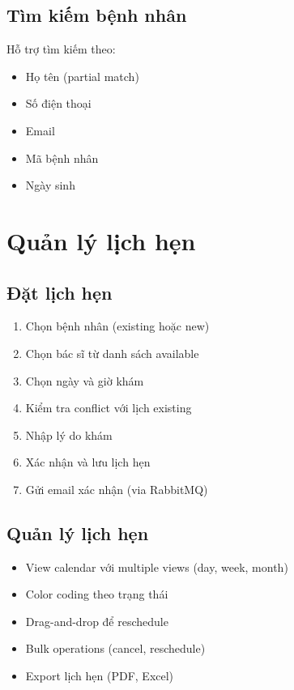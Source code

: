 \documentclass[12pt,a4paper]{report}
\begin{document}
    \subsection{Tìm kiếm bệnh nhân}
    Hỗ trợ tìm kiếm theo:
    \begin{itemize}
        \item Họ tên (partial match)
        \item Số điện thoại
        \item Email
        \item Mã bệnh nhân
        \item Ngày sinh
    \end{itemize}

    \section{Quản lý lịch hẹn}

    \subsection{Đặt lịch hẹn}
    \begin{enumerate}
        \item Chọn bệnh nhân (existing hoặc new)
        \item Chọn bác sĩ từ danh sách available
        \item Chọn ngày và giờ khám
        \item Kiểm tra conflict với lịch existing
        \item Nhập lý do khám
        \item Xác nhận và lưu lịch hẹn
        \item Gửi email xác nhận (via RabbitMQ)
    \end{enumerate}

    \subsection{Quản lý lịch hẹn}
    \begin{itemize}
        \item View calendar với multiple views (day, week, month)
        \item Color coding theo trạng thái
        \item Drag-and-drop để reschedule
        \item Bulk operations (cancel, reschedule)
        \item Export lịch hẹn (PDF, Excel)
    \end{itemize}
\end{document}
